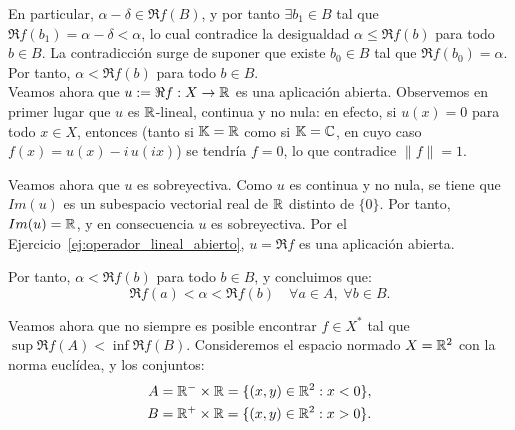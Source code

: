 \begin{ejercicio}
\begin{description}
        En particular, $\alpha - \delta \in \Re f(B)$, y por tanto $\exists b_1 \in B$ tal que $\Re f(b_1) = \alpha - \delta < \alpha$, lo cual contradice la desigualdad $\alpha \leq \Re f(b)$ para todo $b \in B$. La contradicción surge de suponer que existe $b_0 \in B$ tal que $\Re f(b_0) = \alpha$. Por tanto, $\alpha < \Re f(b)$ para todo $b \in B$.\\

        Veamos ahora que $u := \Re f : X \to \mathbb{R}$ es una aplicación abierta. Observemos en primer lugar que $u$ es $\mathbb{R}$-lineal, continua y no nula: en efecto, si $u(x) = 0$ para todo $x \in X$, entonces (tanto si $\mathbb{K} = \mathbb{R}$ como si $\mathbb{K} = \mathbb{C}$, en cuyo caso $f(x) = u(x) - i\,u(ix)$) se tendría $f = 0$, lo que contradice $\|f\| = 1$.
        
        Veamos ahora que $u$ es sobreyectiva. Como $u$ es continua y no nula, se tiene que $Im(u)$ es un subespacio vectorial real de $\mathbb{R}$ distinto de $\{0\}$. Por tanto, $Im(u) = \mathbb{R}$, y en consecuencia $u$ es sobreyectiva. Por el Ejercicio~\ref{ej:operador_lineal_abierto}, $u=\Re f$ es una aplicación abierta.
    \end{description}


    Por tanto, $\alpha < \Re f(b)$ para todo $b \in B$, y concluimos que:
    \[
        \Re f(a) < \alpha < \Re f(b) \quad \forall a \in A, \; \forall b \in B.
    \]


    Veamos ahora que no siempre es posible encontrar $f \in X^*$ tal que $\sup \Re f(A) < \inf \Re f(B)$. Consideremos el espacio normado $X = \mathbb{R}^2$ con la norma euclídea, y los conjuntos:
    \begin{align*}
        A &= \mathbb{R}^- \times \mathbb{R} = \{(x, y) \in \mathbb{R}^2 : x < 0\}, \\
        B &= \mathbb{R}^+ \times \mathbb{R} = \{(x, y) \in \mathbb{R}^2 : x > 0\}.
    \end{align*}


\end{ejercicio}
